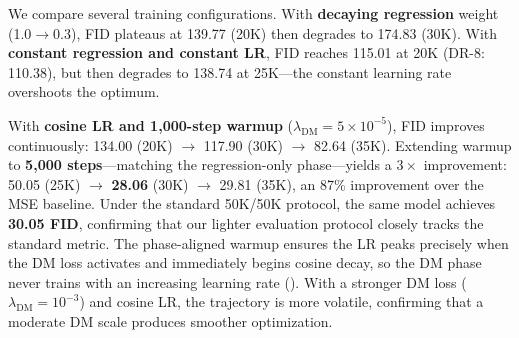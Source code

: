 \documentclass{article}
\theoremstyle{plain}
\theoremstyle{remark}
\begin{document}
We compare several training configurations. With \textbf{decaying regression} weight (1.0$\to$0.3), FID plateaus at 139.77 (20K) then degrades to 174.83 (30K). With \textbf{constant regression and constant LR}, FID reaches 115.01 at 20K (DR-8: 110.38), but then degrades to 138.74 at 25K---the constant learning rate overshoots the optimum.

With \textbf{cosine LR and 1,000-step warmup} ($\lambda_{\text{DM}} = 5 \times 10^{-5}$), FID improves continuously: 134.00 (20K) $\to$ 117.90 (30K) $\to$ 82.64 (35K). Extending warmup to \textbf{5,000 steps}---matching the regression-only phase---yields a $3{\times}$ improvement: 50.05 (25K) $\to$ \textbf{28.06} (30K) $\to$ 29.81 (35K), an 87\% improvement over the MSE baseline. Under the standard 50K/50K protocol, the same model achieves \textbf{30.05 FID}, confirming that our lighter evaluation protocol closely tracks the standard metric. The phase-aligned warmup ensures the LR peaks precisely when the DM loss activates and immediately begins cosine decay, so the DM phase never trains with an increasing learning rate (). With a stronger DM loss ($\lambda_{\text{DM}} = 10^{-3}$) and cosine LR, the trajectory is more volatile, confirming that a moderate DM scale produces smoother optimization.
\end{document}

